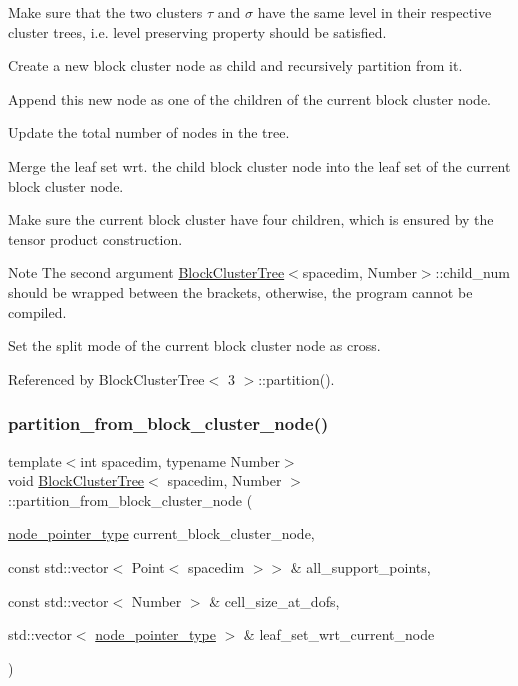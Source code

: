 Make sure that the two clusters $\tau$ and $\sigma$ have the same level in their respective cluster trees, i.\+e. level preserving property should be satisfied.

Create a new block cluster node as child and recursively partition from it.

Append this new node as one of the children of the current block cluster node.

Update the total number of nodes in the tree.

Merge the leaf set wrt. the child block cluster node into the leaf set of the current block cluster node.

Make sure the current block cluster have four children, which is ensured by the tensor product construction.


\begin{DoxyDescription}
\item[Note ]The second argument {\ttfamily \hyperlink{classBlockClusterTree}{Block\+Cluster\+Tree}$<$spacedim}, Number$>$\+::child\+\_\+num should be wrapped between the brackets, otherwise, the program cannot be compiled. 
\end{DoxyDescription}

Set the split mode of the current block cluster node as cross.

Referenced by Block\+Cluster\+Tree$<$ 3 $>$\+::partition().

\mbox{\label{classBlockClusterTree_a425583a70d63ddbf9341a31b736bd0fe}} 
\subsubsection{\texorpdfstring{partition\+\_\+from\+\_\+block\+\_\+cluster\+\_\+node()}{partition\_from\_block\_cluster\_node()}\hspace{0.1cm}{\footnotesize\ttfamily [2/2]}}
{\footnotesize\ttfamily template$<$int spacedim, typename Number$>$ \\
void \hyperlink{classBlockClusterTree}{Block\+Cluster\+Tree}$<$ spacedim, Number $>$\+::partition\+\_\+from\+\_\+block\+\_\+cluster\+\_\+node (\begin{DoxyParamCaption}\item[{\hyperlink{classTreeNode}{node\+\_\+pointer\+\_\+type}}]{current\+\_\+block\+\_\+cluster\+\_\+node,  }\item[{const std\+::vector$<$ Point$<$ spacedim $>$$>$ \&}]{all\+\_\+support\+\_\+points,  }\item[{const std\+::vector$<$ Number $>$ \&}]{cell\+\_\+size\+\_\+at\+\_\+dofs,  }\item[{std\+::vector$<$ \hyperlink{classTreeNode}{node\+\_\+pointer\+\_\+type} $>$ \&}]{leaf\+\_\+set\+\_\+wrt\+\_\+current\+\_\+node }\end{DoxyParamCaption})\hspace{0.3cm}{\ttfamily [private]}}

